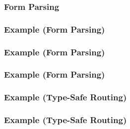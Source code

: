 \begin{frame}
  \frametitle{Form Parsing}
  
\end{frame}

\begin{frame}
\end{frame}

\begin{frame}
  \frametitle{Example (Form Parsing)}
  
\end{frame}

\begin{frame}
  \frametitle{Example (Form Parsing)}
  
\end{frame}

\begin{frame}
  \frametitle{Example (Form Parsing)}
  
\end{frame}

\begin{frame}
\end{frame}

\begin{frame}
\end{frame}

\begin{frame}
  \frametitle{Example (Type-Safe Routing)}
  
\end{frame}

\begin{frame}
  \frametitle{Example (Type-Safe Routing)}
  
\end{frame}

